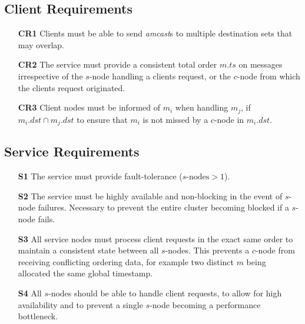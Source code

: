 	\subsection*{Client Requirements}
	\begin{itemize}
		\item [\textbf{CR1}] Clients must be able to send \emph{amcast}s to multiple destination sets that may overlap.
		
		\item [\textbf{CR2}] The service must provide a consistent total order $m.ts$ on messages irrespective of the $s$-node handling a clients request, or the $c$-node from which the clients request originated.  
		
		\item [\textbf{CR3}] Client nodes must be informed of $m_i$ when handling $m_j$, if $m_i.dst \cap m_j.dst$ to ensure that $m_i$ is not missed by a $c$-node in $m_i.dst$.  
	\end{itemize}
	
    \subsection*{Service Requirements}
	\begin{itemize}
		\item [\textbf{S1}] The service must provide fault-tolerance ($s\text{-nodes} > 1$).
		
		\item [\textbf{S2}] The service must be highly available and non-blocking in the event of $s$-node failures.  Necessary to prevent the entire cluster becoming blocked if a $s$-node fails.   
		
		\item [\textbf{S3}] All service nodes must process client requests in the exact same order to maintain a consistent state between all $s$-nodes.  This prevents a $c$-node from receiving conflicting ordering data, for example two distinct $m$ being allocated the same global timestamp.  
		
		\item [\textbf{S4}] All $s$-nodes should be able to handle client requests, to allow for high availability and to prevent a single $s$-node becoming a performance bottleneck.
	\end{itemize}

